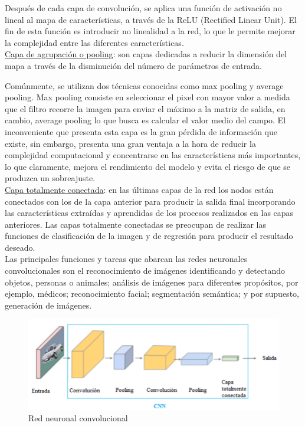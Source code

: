Después de cada capa de convolución, se aplica una función de activación no lineal al mapa de características, a través de la ReLU (Rectified Linear Unit). El fin de esta función es introducir no linealidad a la red, lo que le permite mejorar la complejidad entre las diferentes características. \\

\underline{Capa de agrupación o pooling}: son capas dedicadas a reducir la dimensión del mapa a través de la disminución del número de parámetros de entrada.

Comúnmente, se utilizan dos técnicas conocidas como max pooling y average pooling. Max pooling consiste en seleccionar el pixel con mayor valor a medida que el filtro recorre la imagen para enviar el máximo a la matriz de salida, en cambio, average pooling lo que busca es calcular el valor medio del campo. El inconveniente que presenta esta capa es la gran pérdida de información que existe, sin embargo, presenta una gran ventaja a la hora de reducir la complejidad computacional y concentrarse en las características más importantes, lo que claramente, mejora el rendimiento del modelo y evita el riesgo de que se produzca un sobreajuste.\\

\underline{Capa totalmente conectada}: en las últimas capas de la red los nodos están conectados con los de la capa anterior para producir la salida final incorporando las características extraídas y aprendidas de los procesos realizados en las capas anteriores. Las capas totalmente conectadas se preocupan de realizar las funciones de clasificación de la imagen y de regresión para producir el resultado deseado. \\

Las principales funciones y tareas que abarcan las redes neuronales convolucionales son el reconocimiento de imágenes identificando y detectando objetos, personas o animales; análisis de imágenes para diferentes propósitos, por ejemplo, médicos; reconocimiento facial; segmentación semántica; y por supuesto, generación de imágenes.\\

\begin{figure}[h]
	\centering
	\includegraphics[width = 1 \textwidth]{Imagenes/Vectorial/cnn.png}
	\caption{Red neuronal convolucional}
	\label{fig:cnn}
\end{figure}

